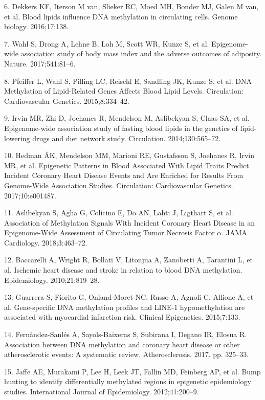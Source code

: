 \documentclass[]{bmcart}
\begin{document}
6. Dekkers KF, Iterson M van, Slieker RC, Moed MH, Bonder MJ, Galen M
van, et al. Blood lipids influence DNA methylation in circulating cells.
Genome biology. 2016;17:138.

7. Wahl S, Drong A, Lehne B, Loh M, Scott WR, Kunze S, et al.
Epigenome-wide association study of body mass index and the adverse
outcomes of adiposity. Nature. 2017;541:81--6.

8. Pfeiffer L, Wahl S, Pilling LC, Reischl E, Sandling JK, Kunze S, et
al. DNA Methylation of Lipid-Related Genes Affects Blood Lipid Levels.
Circulation: Cardiovascular Genetics. 2015;8:334--42.

9. Irvin MR, Zhi D, Joehanes R, Mendelson M, Aslibekyan S, Claas SA, et
al. Epigenome-wide association study of fasting blood lipids in the
genetics of lipid-lowering drugs and diet network study. Circulation.
2014;130:565--72.

10. Hedman ÅK, Mendelson MM, Marioni RE, Gustafsson S, Joehanes R, Irvin
MR, et al. Epigenetic Patterns in Blood Associated With Lipid Traits
Predict Incident Coronary Heart Disease Events and Are Enriched for
Results From Genome-Wide Association Studies. Circulation:
Cardiovascular Genetics. 2017;10:e001487.

11. Aslibekyan S, Agha G, Colicino E, Do AN, Lahti J, Ligthart S, et al.
Association of Methylation Signals With Incident Coronary Heart Disease
in an Epigenome-Wide Assessment of Circulating Tumor Necrosis Factor
\(\alpha\). JAMA Cardiology. 2018;3:463--72.

12. Baccarelli A, Wright R, Bollati V, Litonjua A, Zanobetti A,
Tarantini L, et al. Ischemic heart disease and stroke in relation to
blood DNA methylation. Epidemiology. 2010;21:819--28.

13. Guarrera S, Fiorito G, Onland-Moret NC, Russo A, Agnoli C, Allione
A, et al. Gene-specific DNA methylation profiles and LINE-1
hypomethylation are associated with myocardial infarction risk. Clinical
Epigenetics. 2015;7:133.

14. Fern{á}ndez-Sanl{é}s A, Sayols-Baixeras S, Subirana I, Degano IR,
Elosua R. Association between DNA methylation and coronary heart disease
or other atherosclerotic events: A systematic review. Atherosclerosis.
2017. pp. 325--33.

15. Jaffe AE, Murakami P, Lee H, Leek JT, Fallin MD, Feinberg AP, et al.
Bump hunting to identify differentially methylated regions in epigenetic
epidemiology studies. International Journal of Epidemiology.
2012;41:200--9.
\end{document}
